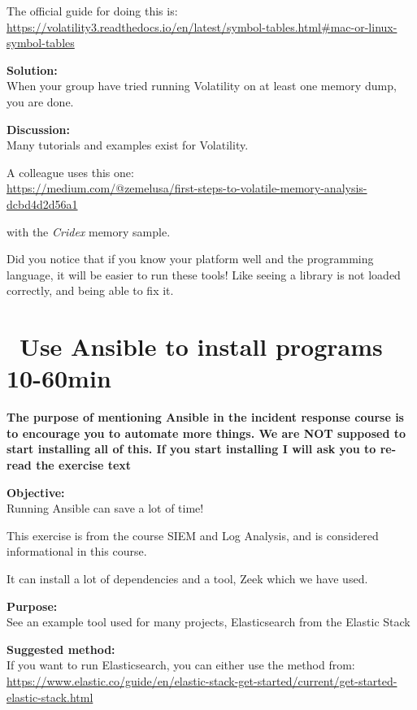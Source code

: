 \documentclass[a4paper,11pt,notitlepage]{report}
\begin{document}
The official guide for doing this is:
\url{https://volatility3.readthedocs.io/en/latest/symbol-tables.html#mac-or-linux-symbol-tables}

{\bf Solution:}\\
When your group have tried running Volatility on at least one memory dump, you are done.

{\bf Discussion:}\\
Many tutorials and examples exist for Volatility.

A colleague uses this one:\\
\url{https://medium.com/@zemelusa/first-steps-to-volatile-memory-analysis-dcbd4d2d56a1}

with the \emph{Cridex} memory sample.

Did you notice that if you know your platform well and the programming language, it will be easier to run these tools! Like seeing a library is not loaded correctly, and being able to fix it.



\chapter{\faInfoCircle\ Use Ansible to install programs 10-60min}
\label{ex:basicansible}


{\bf\LARGE  The purpose of mentioning Ansible in the incident response course is to encourage you to automate more things. We are NOT supposed to start installing all of this. If you start installing I will ask you to re-read the exercise text \smiley}

{\bf Objective:}\\
Running Ansible can save a lot of time!

This exercise is from the course SIEM and Log Analysis, and is considered informational in this course.

It can install a lot of dependencies and a tool, Zeek which we have used.


{\bf Purpose:}\\
See an example tool used for many projects, Elasticsearch from the Elastic Stack

{\bf Suggested method:}\\
If you want to run Elasticsearch, you can either use the method from:\\{\footnotesize
\url{https://www.elastic.co/guide/en/elastic-stack-get-started/current/get-started-elastic-stack.html}}
\end{document}
